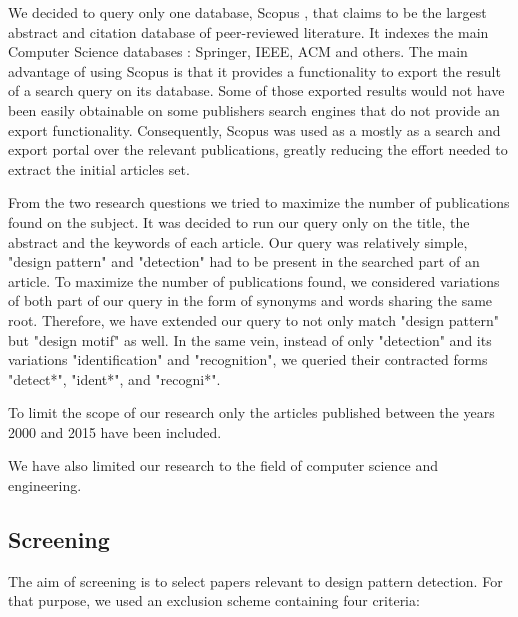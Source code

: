 \documentclass[letterpaper, 10 pt, conference]{ieeeconf}  %
\begin{document}
We decided to query only one database, Scopus \cite{c2}, that claims to be the
largest abstract and citation database of peer-reviewed literature.
It indexes the main Computer Science databases : Springer, IEEE, ACM and
others.
The main advantage of using Scopus is that it provides a functionality to
export the result of a search query on its database.
Some of those exported results would not have been easily obtainable on some
publishers search engines that do not provide an export functionality.
Consequently, Scopus was used as a mostly as a search and export portal over the
relevant publications, greatly reducing the effort needed to extract the
initial articles set. 

From the two research questions we tried to maximize the number of publications
found on the subject.
It was decided to run our query only on the title, the abstract and the keywords of
each article. 
Our query was relatively simple,  "design pattern" and "detection" had to be present
in the searched part of an article.
To maximize the number of publications found, we considered variations of both part
of our query in the form of synonyms and words sharing the same root.
Therefore, we have extended our query to not only match "design pattern" but "design motif" as well. In the same vein, instead of only "detection" and its variations
"identification" and "recognition", we queried their contracted forms "detect*",
"ident*", and "recogni*".

To limit the scope of our research only the articles published between the years
2000 and 2015 have been included. 

We have also limited our research to the field of computer science and
engineering.


\subsection{Screening}

The aim of screening is to select papers relevant to design pattern detection.
For that purpose, we used an exclusion scheme containing four criteria:
\end{document}
